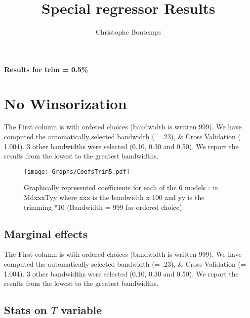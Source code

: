\documentclass[a4paper]{article}
\title{Special regressor Results}
\author{Christophe Bontemps }
\begin{document}
\begin{center}
\Large{\textbf{Results for trim = 0.5\% }}
\end{center}

\section{No Winsorization}
The First column is with ordered choices (bandwidth is written 999). We  have computed the  automatically selected bandwidth  (= .23), \& Cross Validation (= 1.004). 3 other  bandwidths were selected (0.10, 0.30 and 0.50). We report the results from the lowest to the greatest bandwidths. \\



\newpage

\begin{sidewaysfigure}[h!]
\caption{Graphically represented coefficients for each of the 6 models : in MdxxxTyy  where xxx is the bandwidth x 100 and yy is the trimming *10
(Bandwidth = 999 for ordered choice)}\label{PlotFOK}
\texttt{[image: Graphs/CoefsTrim5.pdf]}

\end{sidewaysfigure}
\clearpage

\subsection{Marginal effects}
%



The First column is with ordered choices (bandwidth is written 999). We  have computed the  automatically selected bandwidth  (= .23), \& Cross Validation (= 1.004). 3 other  bandwidths were selected (0.10, 0.30 and 0.50). We report the results from the lowest to the greatest bandwidths. \\




\newpage
\subsection{Stats on $T$ variable}


\end{document}
